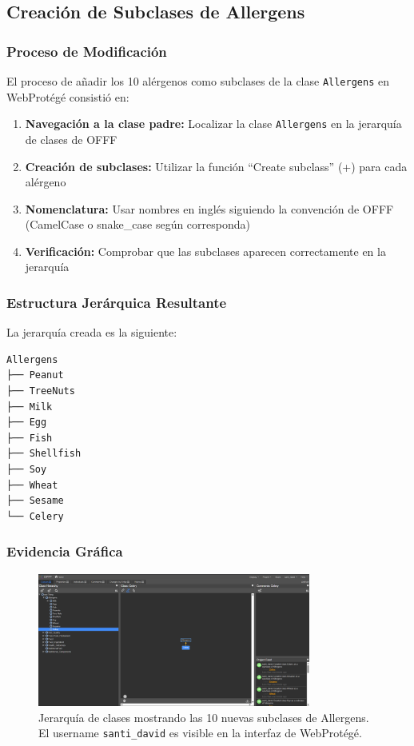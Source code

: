\documentclass[12pt,a4paper]{article}
\begin{document}
\subsection{Creación de Subclases de Allergens}

\subsubsection{Proceso de Modificación}

El proceso de añadir los 10 alérgenos como subclases de la clase \texttt{Allergens} en WebProtégé consistió en:

\begin{enumerate}
    \item \textbf{Navegación a la clase padre:} Localizar la clase \texttt{Allergens} en la jerarquía de clases de OFFF
    \item \textbf{Creación de subclases:} Utilizar la función ``Create subclass'' (+) para cada alérgeno
    \item \textbf{Nomenclatura:} Usar nombres en inglés siguiendo la convención de OFFF (CamelCase o snake\_case según corresponda)
    \item \textbf{Verificación:} Comprobar que las subclases aparecen correctamente en la jerarquía
\end{enumerate}

\subsubsection{Estructura Jerárquica Resultante}

La jerarquía creada es la siguiente:

\begin{verbatim}
Allergens
├── Peanut
├── TreeNuts
├── Milk
├── Egg
├── Fish
├── Shellfish
├── Soy
├── Wheat
├── Sesame
└── Celery
\end{verbatim}

\subsubsection{Evidencia Gráfica}

\begin{figure}[H]
    \centering
    \includegraphics[width=0.8\textwidth]{screenshots/Allergens.png}
    \caption{Jerarquía de clases mostrando las 10 nuevas subclases de Allergens. El username \texttt{santi\_david} es visible en la interfaz de WebProtégé.}
    \label{fig:allergens_hierarchy}
\end{figure}
\end{document}

